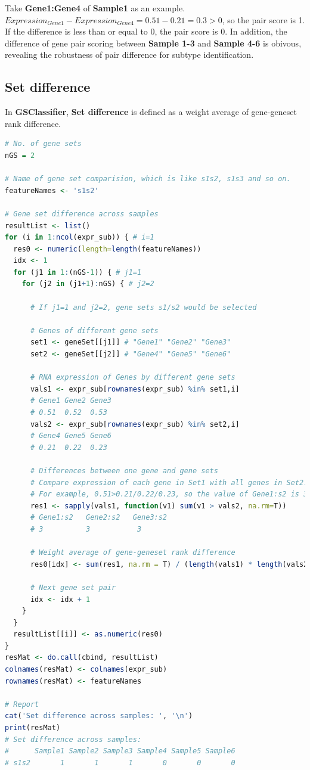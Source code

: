 \documentclass[
  12pt,
]{book}
\begin{document}
Take \textbf{Gene1:Gene4} of \textbf{Sample1} as an example. \(Expression_{Gene1} - Expression_{Gene4} = 0.51-0.21 = 0.3 > 0\), so the pair score is 1. If the difference is less than or equal to 0, the pair score is 0. In addition, the difference of gene pair scoring between \textbf{Sample 1-3} and \textbf{Sample 4-6} is obivous, revealing the robustness of pair difference for subtype identification.

\hypertarget{set-difference}{%
\subsection{Set difference}\label{set-difference}}

In \textbf{GSClassifier}, \textbf{Set difference} is defined as a weight average of gene-geneset rank difference.

\begin{lstlisting}[language=R]
# No. of gene sets
nGS = 2

# Name of gene set comparision, which is like s1s2, s1s3 and so on.
featureNames <- 's1s2'

# Gene set difference across samples
resultList <- list()
for (i in 1:ncol(expr_sub)) { # i=1
  res0 <- numeric(length=length(featureNames))
  idx <- 1
  for (j1 in 1:(nGS-1)) { # j1=1
    for (j2 in (j1+1):nGS) { # j2=2
      
      # If j1=1 and j2=2, gene sets s1/s2 would be selected
      
      # Genes of different gene sets
      set1 <- geneSet[[j1]] # "Gene1" "Gene2" "Gene3"
      set2 <- geneSet[[j2]] # "Gene4" "Gene5" "Gene6"
      
      # RNA expression of Genes by different gene sets
      vals1 <- expr_sub[rownames(expr_sub) %in% set1,i]
      # Gene1 Gene2 Gene3
      # 0.51  0.52  0.53
      vals2 <- expr_sub[rownames(expr_sub) %in% set2,i]
      # Gene4 Gene5 Gene6
      # 0.21  0.22  0.23

      # Differences between one gene and gene sets
      # Compare expression of each gene in Set1 with all genes in Set2. 
      # For example, 0.51>0.21/0.22/0.23, so the value of Gene1:s2 is 3.
      res1 <- sapply(vals1, function(v1) sum(v1 > vals2, na.rm=T))
      # Gene1:s2   Gene2:s2   Gene3:s2
      # 3          3           3
      
      # Weight average of gene-geneset rank difference
      res0[idx] <- sum(res1, na.rm = T) / (length(vals1) * length(vals2))
      
      # Next gene set pair
      idx <- idx + 1
    }
  }
  resultList[[i]] <- as.numeric(res0)
}
resMat <- do.call(cbind, resultList)
colnames(resMat) <- colnames(expr_sub)
rownames(resMat) <- featureNames

# Report 
cat('Set difference across samples: ', '\n')
print(resMat)
# Set difference across samples:  
#      Sample1 Sample2 Sample3 Sample4 Sample5 Sample6
# s1s2       1       1       1       0       0       0
\end{lstlisting}
\end{document}
